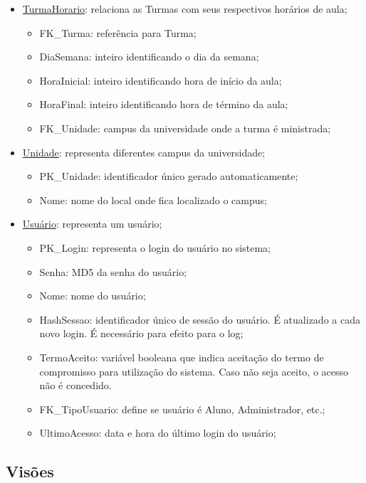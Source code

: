 \documentclass[graduacao,brazil]{ThesisPUC}
\begin{document}
\begin{itemize}
	\item \underline{TurmaHorario}: relaciona as Turmas com seus respectivos horários de aula;
	\begin{itemize}
		\item FK\_Turma: referência para Turma;
		\item DiaSemana: inteiro identificando o dia da semana;
		\item HoraInicial: inteiro identificando hora de início da aula;
		\item HoraFinal: inteiro identificando hora de término da aula;
		\item FK\_Unidade: campus da universidade onde a turma é ministrada;
	\end{itemize}

	\item \underline{Unidade}: representa diferentes campus da universidade;
	\begin{itemize}
		\item PK\_Unidade: identificador único gerado automaticamente;
		\item Nome: nome do local onde fica localizado o campus;
	\end{itemize}

	\item \underline{Usuário}: representa um usuário;
	\begin{itemize}
		\item PK\_Login: representa o login do usuário no sistema;
		\item Senha: MD5 da senha do usuário;
		\item Nome: nome do usuário;
		\item HashSessao: identificador único de sessão do usuário. É atualizado a cada novo login. É necessário para efeito para o log;
		\item TermoAceito: variável booleana que indica aceitação do termo de compromisso para utilização do sistema. Caso não seja aceito, o acesso não é concedido.
		\item FK\_TipoUsuario: define se usuário é Aluno, Administrador, etc.;
		\item UltimoAcesso: data e hora do último login do usuário;
	\end{itemize}

\end{itemize}

\subsection{Visões}
\end{document}

